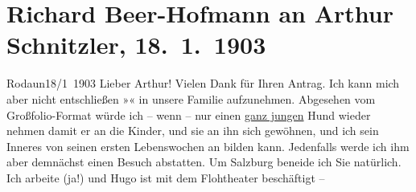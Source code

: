

         
         \renewcommand{\erwaehntePersonen}{Personen: Richard Beer-Hofmann, Hugo von Hofmannsthal, Olga Schnitzler, Heinrich Schnitzler, Gustav Schwarzkopf}
         \renewcommand{\erwaehnteInstitutionen}{Institutionen: Akademischer Verein für Kunst und Literatur}
         \renewcommand{\erwaehnteOrte}{Orte: Hallein, Rodaun, Salzburg, Theater an der Wien, Wien}
         \renewcommand{\erwaehnteWerke}{Werke: Elpenor. Trauerspiel}
               \section[Richard Beer-Hofmann an Arthur Schnitzler, 18. 1. 1903]{ Richard Beer-Hofmann an Arthur Schnitzler, 18. 1. 1903}\nopagebreak{}\rehead{ }\begin{ledgroupsized}[t]{13cm}\normalsize\beginnumbering{} \toendnotes[C]{\smallbreak\pagebreak[2]} 
\toendnotes[C]{\smallbreak}\pstart
           \raggedleft{}{\pb}Rodaun18/1 1903\pend
           \pstart
           Lieber Arthur! Vielen Dank für Ihren Antrag. Ich kann mich aber
               nicht entschließen »\label{K_L01267-1v}\label{K_L01267-1h}« in unsere
               Familie aufzunehmen. Abgesehen vom Großfolio-Format würde ich – wenn – nur einen \uline{ganz jungen} Hund wieder nehmen damit er an die Kinder,
               und sie an ihn sich gewöhnen, und ich sein Inneres von seinen ersten Lebenswochen an
               bilden kann. Jedenfalls werde ich ihm aber demnächst einen Besuch abstatten. Um Salzburg beneide ich Sie na{\pb}türlich. Ich arbeite (ja!) und Hugo ist mit dem Flohtheater beschäftigt –

\end{ledgroupsized}

